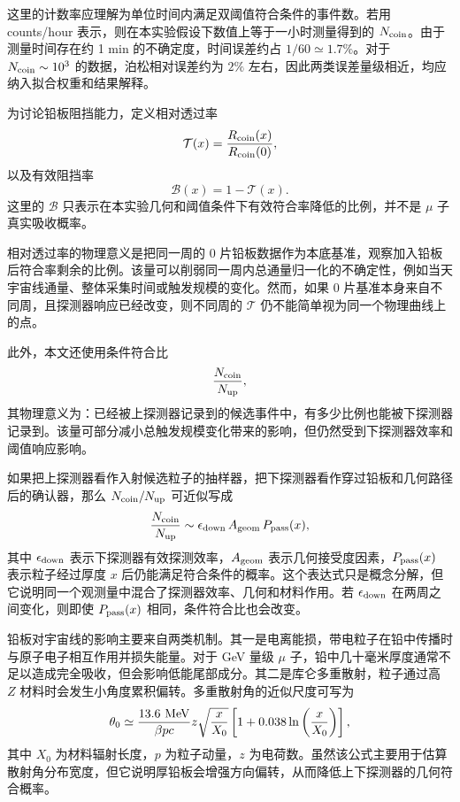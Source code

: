 \documentclass[aps,prl,twocolumn,superscriptaddress,nofootinbib]{revtex4-2}
\begin{document}
这里的计数率应理解为单位时间内满足双阈值符合条件的事件数。若用 counts/hour 表示，则在本实验假设下数值上等于一小时测量得到的 $N_{\rm coin}$。由于测量时间存在约 1 min 的不确定度，时间误差约占 $1/60\simeq1.7\%$。对于 $N_{\rm coin}\sim10^3$ 的数据，泊松相对误差约为 $2\%$ 左右，因此两类误差量级相近，均应纳入拟合权重和结果解释。

为讨论铅板阻挡能力，定义相对透过率
\begin{equation}
\mathcal{T}(x)=\frac{R_{\rm coin}(x)}{R_{\rm coin}(0)},
\end{equation}
以及有效阻挡率
\begin{equation}
\mathcal{B}(x)=1-\mathcal{T}(x).
\end{equation}
这里的 $\mathcal{B}$ 只表示在本实验几何和阈值条件下有效符合率降低的比例，并不是 $\mu$ 子真实吸收概率。

相对透过率的物理意义是把同一周的 0 片铅板数据作为本底基准，观察加入铅板后符合率剩余的比例。该量可以削弱同一周内总通量归一化的不确定性，例如当天宇宙线通量、整体采集时间或触发规模的变化。然而，如果 0 片基准本身来自不同周，且探测器响应已经改变，则不同周的 $\mathcal{T}$ 仍不能简单视为同一个物理曲线上的点。

此外，本文还使用条件符合比
\begin{equation}
\frac{N_{\rm coin}}{N_{\rm up}},
\end{equation}
其物理意义为：已经被上探测器记录到的候选事件中，有多少比例也能被下探测器记录到。该量可部分减小总触发规模变化带来的影响，但仍然受到下探测器效率和阈值响应影响。

如果把上探测器看作入射候选粒子的抽样器，把下探测器看作穿过铅板和几何路径后的确认器，那么 $N_{\rm coin}/N_{\rm up}$ 可近似写成
\begin{equation}
\frac{N_{\rm coin}}{N_{\rm up}}
\sim \epsilon_{\rm down}\, A_{\rm geom}\, P_{\rm pass}(x),
\end{equation}
其中 $\epsilon_{\rm down}$ 表示下探测器有效探测效率，$A_{\rm geom}$ 表示几何接受度因素，$P_{\rm pass}(x)$ 表示粒子经过厚度 $x$ 后仍能满足符合条件的概率。这个表达式只是概念分解，但它说明同一个观测量中混合了探测器效率、几何和材料作用。若 $\epsilon_{\rm down}$ 在两周之间变化，则即使 $P_{\rm pass}(x)$ 相同，条件符合比也会改变。

铅板对宇宙线的影响主要来自两类机制。其一是电离能损，带电粒子在铅中传播时与原子电子相互作用并损失能量。对于 GeV 量级 $\mu$ 子，铅中几十毫米厚度通常不足以造成完全吸收，但会影响低能尾部成分。其二是库仑多重散射，粒子通过高 $Z$ 材料时会发生小角度累积偏转。多重散射角的近似尺度可写为
\begin{equation}
\theta_0\simeq \frac{13.6\ {\rm MeV}}{\beta pc}z
\sqrt{\frac{x}{X_0}}
\left[1+0.038\ln\left(\frac{x}{X_0}\right)\right],
\end{equation}
其中 $X_0$ 为材料辐射长度，$p$ 为粒子动量，$z$ 为电荷数。虽然该公式主要用于估算散射角分布宽度，但它说明厚铅板会增强方向偏转，从而降低上下探测器的几何符合概率。
\end{document}
